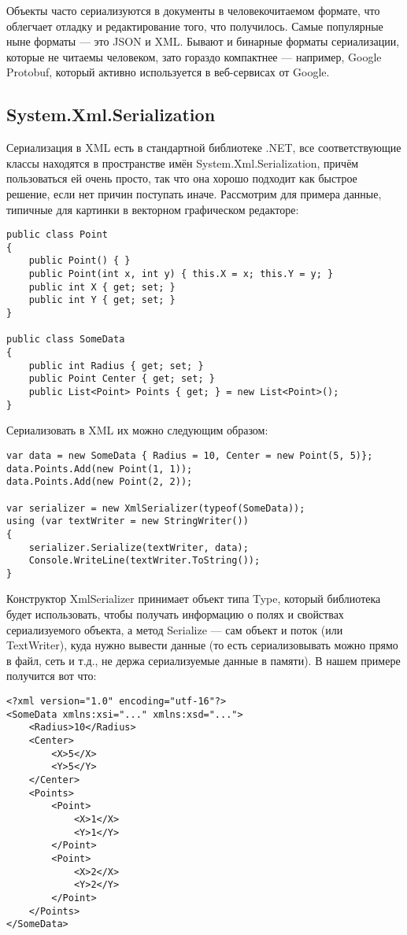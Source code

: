 \documentclass{../../text-style}
\begin{document}
Объекты часто сериализуются в документы в человекочитаемом формате, что облегчает отладку и редактирование того, что получилось. Самые популярные ныне форматы --- это JSON и XML. Бывают и бинарные форматы сериализации, которые не читаемы человеком, зато гораздо компактнее --- например, Google Protobuf, который активно используется в веб-сервисах от Google.

\subsection{System.Xml.Serialization}

Сериализация в XML есть в стандартной библиотеке .NET, все соответствующие классы находятся в пространстве имён System.Xml.Serialization, причём пользоваться ей очень просто, так что она хорошо подходит как быстрое решение, если нет причин поступать иначе. Рассмотрим для примера данные, типичные для картинки в векторном графическом редакторе:

\begin{verbatim}
public class Point
{
    public Point() { }
    public Point(int x, int y) { this.X = x; this.Y = y; }
    public int X { get; set; }
    public int Y { get; set; }
}

public class SomeData
{
    public int Radius { get; set; }
    public Point Center { get; set; }
    public List<Point> Points { get; } = new List<Point>();
}
\end{verbatim}

Сериализовать в XML их можно следующим образом:

\begin{verbatim}
var data = new SomeData { Radius = 10, Center = new Point(5, 5)};
data.Points.Add(new Point(1, 1));
data.Points.Add(new Point(2, 2));

var serializer = new XmlSerializer(typeof(SomeData));
using (var textWriter = new StringWriter())
{
    serializer.Serialize(textWriter, data);
    Console.WriteLine(textWriter.ToString());
}
\end{verbatim}

Конструктор XmlSerializer принимает объект типа Type, который библиотека будет использовать, чтобы получать информацию о полях и свойствах сериализуемого объекта, а метод Serialize --- сам объект и поток (или TextWriter), куда нужно вывести данные (то есть сериализовывать можно прямо в файл, сеть и т.д., не держа сериализуемые данные в памяти). В нашем примере получится вот что:

\begin{verbatim}
<?xml version="1.0" encoding="utf-16"?>
<SomeData xmlns:xsi="..." xmlns:xsd="...">
    <Radius>10</Radius>
    <Center>
        <X>5</X>
        <Y>5</Y>
    </Center>
    <Points>
        <Point>
            <X>1</X>
            <Y>1</Y>
        </Point>
        <Point>
            <X>2</X>
            <Y>2</Y>
        </Point>
    </Points>
</SomeData>
\end{verbatim}
\end{document}
